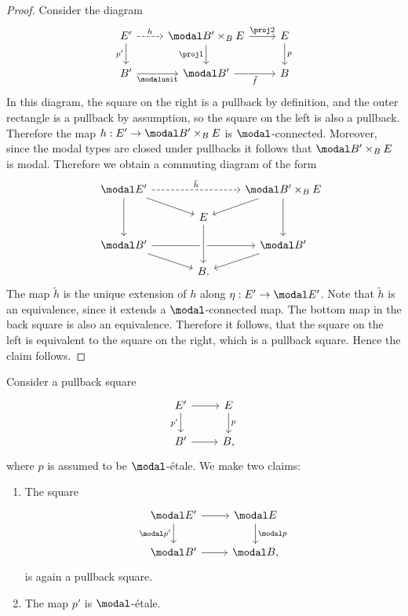 \documentclass{msc}
\begin{document}
\begin{proof}
Consider the diagram
\begin{equation*}
\begin{tikzcd}
E' \arrow[r,dashed,"h"] \arrow[d,swap,"{p'}"] & \modal B'\times_{B} E \arrow[r,"\proj 2"] \arrow[d,swap,"\proj 1"] & E \arrow[d,"p"] \\
B' \arrow[r,swap,"\modalunit"] & \modal B' \arrow[r,swap,"\tilde{f}"] & B
\end{tikzcd}
\end{equation*}
In this diagram, the square on the right is a pullback by definition, and the outer rectangle is a pullback by assumption, so the square on the left is also a pullback. Therefore the map $h:E'\to \modal B'\times_B E$ is $\modal$-connected. Moreover, since the modal types are closed under pullbacks it follows that $\modal B'\times_B E$ is modal. Therefore we obtain a commuting diagram of the form
\begin{equation*}
  \begin{tikzcd}[row sep=small]
    \modal E' \arrow[dd] \arrow[rr,dashed,"\tilde{h}"] \arrow[dr] & & \modal B'\times_B E \arrow[dd] \arrow[dl] \\
    \phantom{\modal B'\times_B E} & E \\
    \modal B' \arrow[rr] \arrow[dr] & & \modal B' \arrow[dl] \\
    & B. \arrow[from=uu,crossing over]
  \end{tikzcd}
\end{equation*}
The map $\tilde{h}$ is the unique extension of $h$ along $\eta:E'\to \modal E'$. Note that $\tilde{h}$ is an equivalence, since it extends a $\modal$-connected map. The bottom map in the back square is also an equivalence. Therefore it follows, that the square on the left is equivalent to the square on the right, which is a pullback square. Hence the claim follows.
\end{proof}

\begin{cor}\label{cor:etale_lex}
Consider a pullback square
\begin{equation*}
\begin{tikzcd}
E' \arrow[d,swap,"{p'}"] \arrow[r] & E \arrow[d,"p"] \\
B' \arrow[r] & B,
\end{tikzcd}
\end{equation*}
where $p$ is assumed to be $\modal$-\'etale. We make two claims:
\begin{enumerate}
\item The square
\begin{equation*}
\begin{tikzcd}
\modal E' \arrow[d,swap,"{\modal p'}"] \arrow[r] & \modal E \arrow[d,"\modal p"] \\
\modal B' \arrow[r] & \modal B,
\end{tikzcd}
\end{equation*}
is again a pullback square.
\item The map $p'$ is $\modal$-\'etale.
\end{enumerate}
\end{cor}
\end{document}
